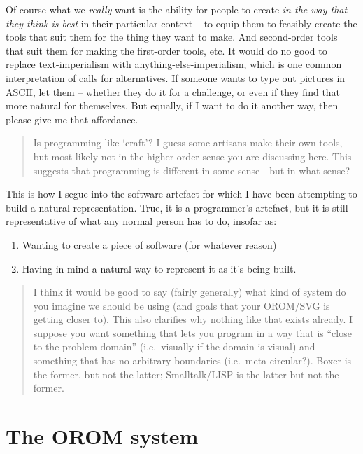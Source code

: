 \documentclass[english,submission]{programming}
\begin{document}
Of course what we \emph{really} want is the ability for people to create
\emph{in the way that they think is best} in their particular context --
to equip them to feasibly create the tools that suit them for the thing
they want to make. And second-order tools that suit them for making the
first-order tools, etc. It would do no good to replace text-imperialism
with anything-else-imperialism, which is one common interpretation of
calls for alternatives. If someone wants to type out pictures in ASCII,
let them -- whether they do it for a challenge, or even if they find
that more natural for themselves. But equally, if I want to do it
another way, then please give me that affordance.

\begin{quote}
Is programming like `craft'? I guess some artisans make their own tools,
but most likely not in the higher-order sense you are discussing here.
This suggests that programming is different in some sense - but in what
sense?
\end{quote}

This is how I segue into the software artefact for which I have been
attempting to build a natural representation. True, it is a programmer's
artefact, but it is still representative of what any normal person has
to do, insofar as:

\begin{enumerate}
\def\labelenumi{\alph{enumi})}
\tightlist
\item
  Wanting to create a piece of software (for whatever reason)
\item
  Having in mind a natural way to represent it as it's being built.
\end{enumerate}

\begin{quote}
I think it would be good to say (fairly generally) what kind of system
do you imagine we should be using (and goals that your OROM/SVG is
getting closer to). This also clarifies why nothing like that exists
already. I suppose you want something that lets you program in a way
that is ``close to the problem domain'' (i.e.~visually if the domain is
visual) and something that has no arbitrary boundaries
(i.e.~meta-circular?). Boxer is the former, but not the latter;
Smalltalk/LISP is the latter but not the former.
\end{quote}

\hypertarget{the-orom-system}{%
\section{The OROM system}\label{the-orom-system}}
\end{document}
